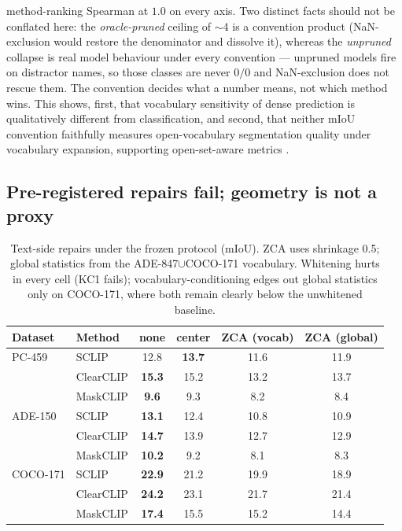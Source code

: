 \documentclass[11pt]{article}
\newcommand{\miou}{mIoU}
\begin{document}
method-ranking Spearman at $1.0$ on every axis. Two distinct facts
should not be conflated here: the \emph{oracle-pruned} ceiling of
$\sim$4 is a convention product (NaN-exclusion would restore the
denominator and dissolve it), whereas the \emph{unpruned} collapse is
real model behaviour under every convention --- unpruned models fire
on distractor names, so those classes are never $0/0$ and NaN-exclusion
does not rescue them. The convention decides what a number means, not
which method wins. This shows, first, that vocabulary sensitivity of dense
prediction is qualitatively different from classification, and second, that
neither \miou{} convention faithfully measures open-vocabulary segmentation quality
under vocabulary expansion, supporting open-set-aware metrics
\citep{zhou2023rethinking}.

\subsection{Pre-registered repairs fail; geometry is not a proxy}
\label{sec:whitening}

\begin{table}[t]
\centering\small
\caption{Text-side repairs under the frozen protocol (\miou{}). ZCA uses shrinkage 0.5;
global statistics from the ADE-847$\cup$COCO-171 vocabulary. Whitening hurts in every
cell (KC1 fails); vocabulary-conditioning edges out global statistics only on
COCO-171, where both remain clearly below the unwhitened baseline.}
\label{tab:whitening}
\begin{tabular}{llcccc}
\toprule
Dataset & Method & none & center & ZCA (vocab) & ZCA (global) \\
\midrule
PC-459  & SCLIP     & 12.8 & \textbf{13.7} & 11.6 & 11.9 \\
        & ClearCLIP & \textbf{15.3} & 15.2 & 13.2 & 13.7 \\
        & MaskCLIP  & \textbf{9.6}  & 9.3  & 8.2  & 8.4 \\
ADE-150 & SCLIP     & \textbf{13.1} & 12.4 & 10.8 & 10.9 \\
        & ClearCLIP & \textbf{14.7} & 13.9 & 12.7 & 12.9 \\
        & MaskCLIP  & \textbf{10.2} & 9.2  & 8.1  & 8.3 \\
COCO-171& SCLIP     & \textbf{22.9} & 21.2 & 19.9 & 18.9 \\
        & ClearCLIP & \textbf{24.2} & 23.1 & 21.7 & 21.4 \\
        & MaskCLIP  & \textbf{17.4} & 15.5 & 15.2 & 14.4 \\
\bottomrule
\end{tabular}
\end{table}
\end{document}
